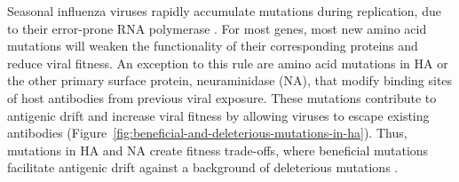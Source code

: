 Seasonal influenza viruses rapidly accumulate mutations during replication, due to their error-prone RNA polymerase \citep{Petrova2018}.
For most genes, most new amino acid mutations will weaken the functionality of their corresponding proteins and reduce viral fitness.
An exception to this rule are amino acid mutations in HA or the other primary surface protein, neuraminidase (NA), that modify binding sites of host antibodies from previous viral exposure.
These mutations contribute to antigenic drift and increase viral fitness by allowing viruses to escape existing antibodies (Figure~\ref{fig:beneficial-and-deleterious-mutations-in-ha}).
Thus, mutations in HA and NA create fitness trade-offs, where beneficial mutations facilitate antigenic drift against a background of deleterious mutations \citep{Koelle:2015dh}.

